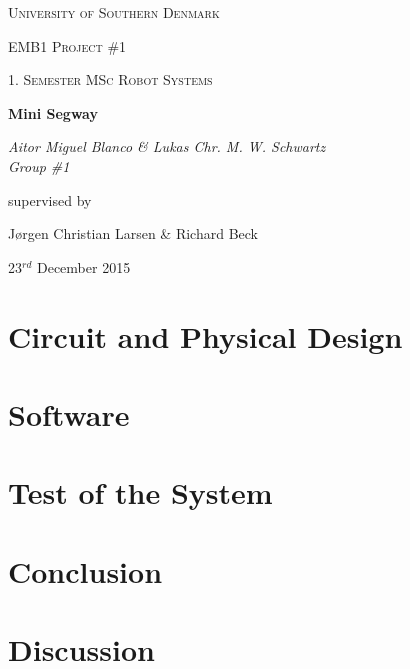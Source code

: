 \documentclass[12pt,a4paper]{article}
\begin{document}
\begin{titlepage}
	\centering
	\vfill
	{\scshape\LARGE University of Southern Denmark\par}
	\vspace{1cm}
	{\scshape\Large EMB1 Project \#1\par}
	{\scshape\large 1. Semester MSc Robot Systems\par}
	\vspace{1.5cm}
	{\huge\bfseries Mini Segway\par}
	\vspace{2cm}
	{\Large\itshape Aitor Miguel Blanco \& Lukas Chr. M. W. Schwartz \\ Group \#1 \par}
	\vfill
	supervised by\par
	J\o rgen Christian Larsen \& Richard Beck

	\vspace{2cm}

	{\large 23$^{rd}$ December 2015 \par}
\end{titlepage}

\pagebreak


\pagebreak


\tableofcontents

\pagebreak

\listoffigures

\listoftables

\pagebreak



\pagebreak


\section{Circuit and Physical Design}






\pagebreak
\section{Software}








\pagebreak
\section{Test of the System}


\pagebreak
\section{Conclusion}


\pagebreak
\section{Discussion}


\pagebreak
\appendix
\end{document}
